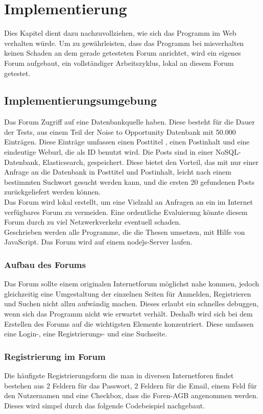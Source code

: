 \section{Implementierung}
Dies Kapitel dient dazu nachzuvollziehen, wie sich das Programm im Web verhalten würde. Um zu gewährleisten, dass das Programm bei misverhalten keinen Schaden an dem gerade getesteten Forum anrichtet, wird ein eigenes Forum aufgebaut, ein vollständiger Arbeitszyklus, lokal an diesem Forum getestet.

\subsection{Implementierungsumgebung}
Das Forum Zugriff auf eine Datenbankquelle haben. Diese besteht für die Dauer der Tests, aus einem Teil der Noise to Opportunity Datenbank mit 50.000 Einträgen. Diese Einträge umfassen einen Posttitel , einen Postinhalt und eine eindeutige Weburl, die als ID benutzt wird. Die Posts sind in einer NoSQL-Datenbank, Elasticsearch, gespeichert. Diese bietet den Vorteil, das mit nur einer Anfrage an die Datenbank in Posttitel und Postinhalt, leicht nach einem bestimmten Suchwort gesucht werden kann, und die ersten 20 gefundenen Posts zurückgeliefert werden können.\\
Das Forum wird lokal erstellt, um eine Vielzahl an Anfragen an ein im Internet verfügbares Forum zu vermeiden. Eine ordentliche Evaluierung könnte diesem Forum durch zu viel Netzwerkverkehr eventuell schaden.\\
Geschrieben werden alle Programme, die die Thesen umsetzen, mit Hilfe von JavaScript. Das Forum wird auf einem node\.js-Server laufen. 
\subsubsection{Aufbau des Forums}
Das Forum sollte einem originalen Internetforum möglichst nahe kommen, jedoch gleichzeitig eine Umgestaltung der einzelnen Seiten für Anmelden, Registrieren und Suchen nicht allzu aufwändig machen. Dieses erlaubt ein schnelles debuggen, wenn sich das Programm nicht wie erwartet verhält. Deshalb wird sich bei dem Erstellen des Forums auf die wichtigsten Elemente konzentriert. Diese umfassen eine Login-, eine Registrierungs- und eine Suchseite.
\subsubsection{Registrierung im Forum}
Die häufigste Registrierungsform die man in diversen Internetforen findet bestehen aus 2 Feldern für das Passwort, 2 Feldern für die Email, einem Feld für den Nutzernamen und eine Checkbox, dass die Foren-AGB angenommen werden. Dieses wird simpel durch das folgende Codebeispiel nachgebaut.

